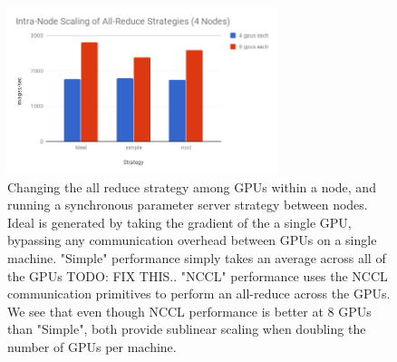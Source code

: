 \begin{figure}
    \centering
    \includegraphics[width=3.1in,keepaspectratio]{fig/intranode.png}
    \caption{
    \small{
        Changing the all reduce strategy among GPUs within a node, and running a synchronous parameter server strategy between nodes. Ideal is generated by taking the gradient of the a single GPU, bypassing any communication overhead between GPUs on a single machine. "Simple" performance simply takes an average across all of the GPUs {\color{red} TODO: FIX THIS.}. "NCCL" performance uses the NCCL communication primitives to perform an all-reduce across the GPUs. We see that even though NCCL performance is better at 8 GPUs than "Simple", both provide sublinear scaling when doubling the number of GPUs per machine.
    }
    }
    \label{fig:intra-node-allreduce-strategy}
\end{figure}
